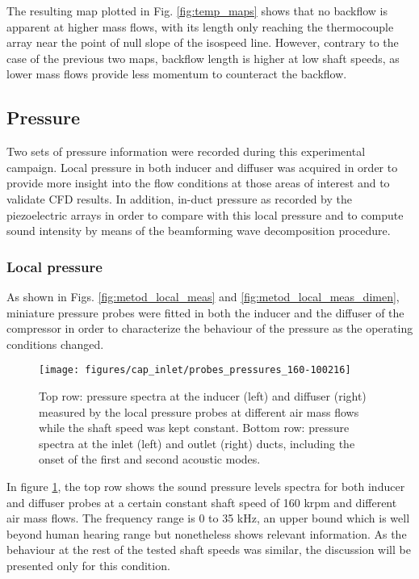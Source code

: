 The resulting map plotted in Fig. \ref{fig:temp_maps} shows that no backflow is apparent at higher mass flows, with its length only reaching the thermocouple array near the point of null slope of the isospeed line. However, contrary to the case of the previous two maps, backflow length is higher at low shaft speeds, as lower mass flows provide less momentum to counteract the backflow.

\subsection{Pressure}
\label{sub:pressure}

Two sets of pressure information were recorded during this experimental campaign. Local pressure in both inducer and diffuser was acquired in order to provide more insight into the flow conditions at those areas of interest and to validate CFD results. In addition, in-duct pressure as recorded by the piezoelectric arrays in order to compare with this local pressure and to compute sound intensity by means of the beamforming wave decomposition procedure.

\subsubsection{Local pressure}

As shown in Figs. \ref{fig:metod_local_meas} and \ref{fig:metod_local_meas_dimen}, miniature pressure probes were fitted in both the inducer and the diffuser of the compressor in order to characterize the behaviour of the pressure as the operating conditions changed.

\begin{figure}[thb!]
\hspace{-0.07\textwidth}
\texttt{[image: figures/cap\_inlet/probes\_pressures\_160-100216]}
\caption{Top row: pressure spectra at the inducer (left) and diffuser (right) measured by the local pressure probes at different air mass flows while the shaft speed was kept constant. Bottom row: pressure spectra at the inlet (left) and outlet (right) ducts, including the onset of the first and second acoustic modes.}
\label{fig:probes_all}
\end{figure}

In figure \ref{fig:probes_all}, the top row shows the sound pressure levels spectra for both inducer and diffuser probes at a certain constant shaft speed of 160 krpm and different air mass flows. The frequency range is 0 to 35 kHz, an upper bound which is well beyond human hearing range but nonetheless shows relevant information. As the behaviour at the rest of the tested shaft speeds was similar, the discussion will be presented only for this condition.

